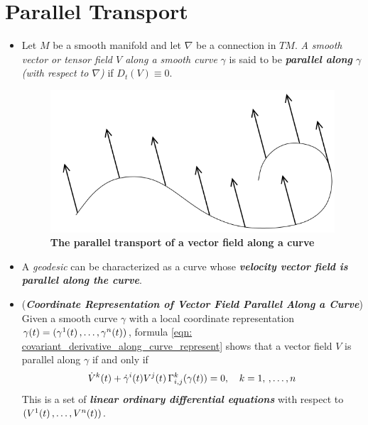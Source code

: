 \documentclass[11pt]{article}
\begin{document}
\section{Parallel Transport}
\begin{itemize}
\item \begin{definition}
Let $M$ be a smooth manifold and let $\nabla$ be a connection in $TM$. \emph{A smooth vector or tensor field $V$ along a smooth curve} $\gamma$ is said to be \emph{\textbf{parallel along} $\gamma$ (with respect to $\nabla$)} if $D_t(V) \equiv 0$.
\end{definition}

\begin{figure}
\begin{minipage}[htb]{1\linewidth}
  \centering
  \centerline{\includegraphics[scale = 0.45]{parallel_transport_along_curve.png}}
\end{minipage}
\caption{\footnotesize{\textbf{The parallel transport of a vector field along a curve \citep{lee2018introduction}}}}
\label{fig: parallel_transport_along_curve}
\end{figure}

\item \begin{remark}
A \emph{geodesic} can be characterized as a curve whose \emph{\textbf{velocity vector field is parallel along the curve}}.
\end{remark}

\item \begin{remark} (\emph{\textbf{Coordinate Representation of Vector Field Parallel Along a Curve}})\\
Given a smooth curve $\gamma$ with a local coordinate representation $\gamma(t) = (\gamma^1(t) \,{,}\ldots{,}\, \gamma^n(t))$, formula \eqref{eqn: covariant_derivative_along_curve_represent} shows that a vector field $V$ is parallel along $\gamma$ if and only if
\begin{align}
\dot{V}^k(t)  + \dot{\gamma}^{i}(t)V^j(t)\,\Gamma_{i,j}^{k}(\gamma(t)) = 0, \quad k=1,\,{,}\ldots{,}\, n \label{eqn: vector_field_parallel_along_curve_represent}
\end{align} This is a set of \emph{\textbf{linear ordinary differential equations}} with respect to $(V^1(t) \,{,}\ldots{,}\, V^n(t))$.
\end{remark}


\end{itemize}
\end{document}
